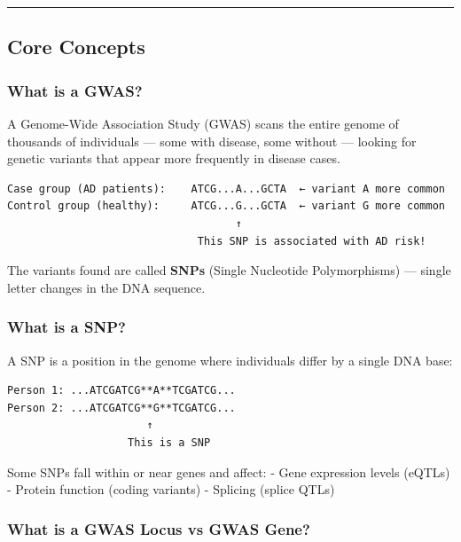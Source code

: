 \documentclass[
]{article}
\begin{document}
\begin{center}\rule{0.5\linewidth}{0.5pt}\end{center}

\subsection{Core Concepts}\label{core-concepts-1}

\subsubsection{What is a GWAS?}\label{what-is-a-gwas}

A Genome-Wide Association Study (GWAS) scans the entire genome of
thousands of individuals --- some with disease, some without --- looking
for genetic variants that appear more frequently in disease cases.

\begin{verbatim}
Case group (AD patients):    ATCG...A...GCTA  ← variant A more common
Control group (healthy):     ATCG...G...GCTA  ← variant G more common
                                    ↑
                              This SNP is associated with AD risk!
\end{verbatim}

The variants found are called \textbf{SNPs} (Single Nucleotide
Polymorphisms) --- single letter changes in the DNA sequence.

\subsubsection{What is a SNP?}\label{what-is-a-snp}

A SNP is a position in the genome where individuals differ by a single
DNA base:

\begin{verbatim}
Person 1: ...ATCGATCG**A**TCGATCG...
Person 2: ...ATCGATCG**G**TCGATCG...
                      ↑
                   This is a SNP
\end{verbatim}

Some SNPs fall within or near genes and affect: - Gene expression levels
(eQTLs) - Protein function (coding variants) - Splicing (splice QTLs)

\subsubsection{What is a GWAS Locus vs GWAS
Gene?}\label{what-is-a-gwas-locus-vs-gwas-gene}
\end{document}
